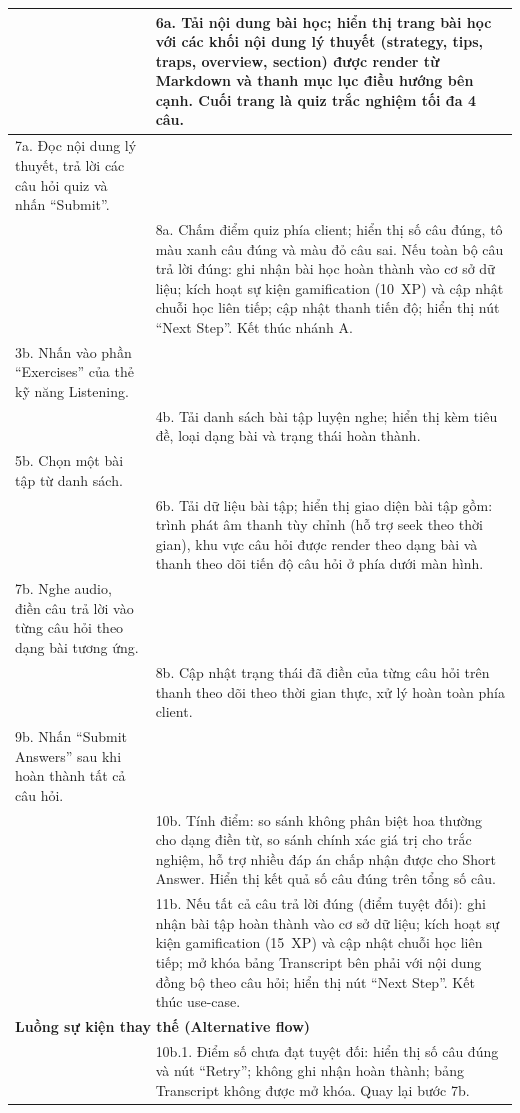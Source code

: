 \begin{longtable}{|p{\tbu}|p{\tbu}|}
    & 6a. Tải nội dung bài học; hiển thị trang bài học với các khối nội dung lý thuyết (strategy, tips, traps, overview, section) được render từ Markdown và thanh mục lục điều hướng bên cạnh. Cuối trang là quiz trắc nghiệm tối đa 4 câu. \\ \hline
    7a. Đọc nội dung lý thuyết, trả lời các câu hỏi quiz và nhấn ``Submit''. & \\ \hline
    & 8a. Chấm điểm quiz phía client; hiển thị số câu đúng, tô màu xanh câu đúng và màu đỏ câu sai. Nếu toàn bộ câu trả lời đúng: ghi nhận bài học hoàn thành vào cơ sở dữ liệu; kích hoạt sự kiện gamification (10~XP) và cập nhật chuỗi học liên tiếp; cập nhật thanh tiến độ; hiển thị nút ``Next Step''. Kết thúc nhánh A. \\ \hline
    3b. Nhấn vào phần ``Exercises'' của thẻ kỹ năng Listening. & \\ \hline
    & 4b. Tải danh sách bài tập luyện nghe; hiển thị kèm tiêu đề, loại dạng bài và trạng thái hoàn thành. \\ \hline
    5b. Chọn một bài tập từ danh sách. & \\ \hline
    & 6b. Tải dữ liệu bài tập; hiển thị giao diện bài tập gồm: trình phát âm thanh tùy chỉnh (hỗ trợ seek theo thời gian), khu vực câu hỏi được render theo dạng bài và thanh theo dõi tiến độ câu hỏi ở phía dưới màn hình. \\ \hline
    7b. Nghe audio, điền câu trả lời vào từng câu hỏi theo dạng bài tương ứng. & \\ \hline
    & 8b. Cập nhật trạng thái đã điền của từng câu hỏi trên thanh theo dõi theo thời gian thực, xử lý hoàn toàn phía client. \\ \hline
    9b. Nhấn ``Submit Answers'' sau khi hoàn thành tất cả câu hỏi. & \\ \hline
    & 10b. Tính điểm: so sánh không phân biệt hoa thường cho dạng điền từ, so sánh chính xác giá trị cho trắc nghiệm, hỗ trợ nhiều đáp án chấp nhận được cho Short Answer. Hiển thị kết quả số câu đúng trên tổng số câu. \\ \hline
    & 11b. Nếu tất cả câu trả lời đúng (điểm tuyệt đối): ghi nhận bài tập hoàn thành vào cơ sở dữ liệu; kích hoạt sự kiện gamification (15~XP) và cập nhật chuỗi học liên tiếp; mở khóa bảng Transcript bên phải với nội dung đồng bộ theo câu hỏi; hiển thị nút ``Next Step''. Kết thúc use-case. \\ \hline
    \multicolumn{2}{|l|}{\textbf{Luồng sự kiện thay thế (Alternative flow)}} \\ \hline
    & 10b.1. Điểm số chưa đạt tuyệt đối: hiển thị số câu đúng và nút ``Retry''; không ghi nhận hoàn thành; bảng Transcript không được mở khóa. Quay lại bước 7b. \\ \hline

\end{longtable}

